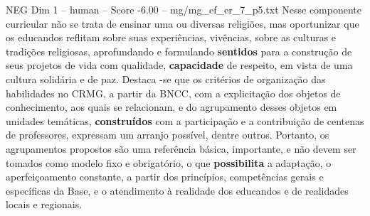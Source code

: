 \begin{textsample}{NEG Dim 1 – human – Score -6.00 – mg/mg\_ef\_er\_7\_p5.txt}  \label{ex:f1_neg_008}
Nesse componente curricular não se trata de ensinar uma ou diversas religiões, mas oportunizar que os educandos reflitam sobre suas experiências, vivências, sobre as culturas e tradições religiosas, aprofundando e formulando \textbf{sentidos} para a construção de seus projetos de vida com qualidade, \textbf{capacidade} de respeito, em vista de uma cultura solidária e de paz.
Destaca -se que os critérios de organização das habilidades no CRMG, a partir da BNCC, com a explicitação dos objetos de conhecimento, aos quais se relacionam, e do agrupamento desses objetos em unidades temáticas, \textbf{construídos} com a participação e a contribuição de centenas de professores, expressam um arranjo possível, dentre outros.
Portanto, os agrupamentos propostos são uma referência básica, importante, e não devem ser tomados como modelo fixo e obrigatório, o que \textbf{possibilita} a adaptação, o aperfeiçoamento constante, a partir dos princípios, competências gerais e específicas da Base, e o atendimento à realidade dos educandos e de realidades locais e regionais.

\end{textsample}
